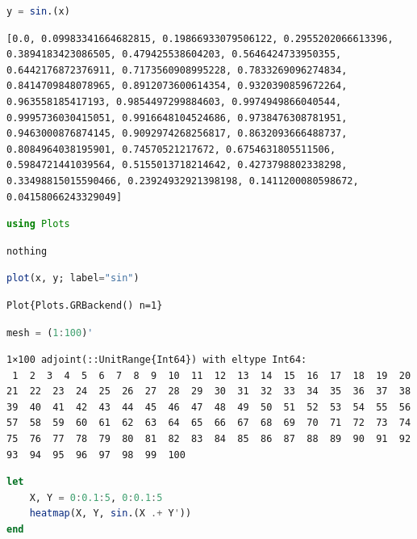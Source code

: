 \documentclass[
  notoc %
]{tufte-book}
\begin{document}
\begin{lstlisting}[language=Julia]
y = sin.(x)
\end{lstlisting}

\begin{lstlisting}[language=Output]
[0.0, 0.09983341664682815, 0.19866933079506122, 0.2955202066613396, 0.3894183423086505, 0.479425538604203, 0.5646424733950355, 0.6442176872376911, 0.7173560908995228, 0.7833269096274834, 0.8414709848078965, 0.8912073600614354, 0.9320390859672264, 0.963558185417193, 0.9854497299884603, 0.9974949866040544, 0.9995736030415051, 0.9916648104524686, 0.9738476308781951, 0.9463000876874145, 0.9092974268256817, 0.8632093666488737, 0.8084964038195901, 0.74570521217672, 0.6754631805511506, 0.5984721441039564, 0.5155013718214642, 0.4273798802338298, 0.33498815015590466, 0.23924932921398198, 0.1411200080598672, 0.04158066243329049]
\end{lstlisting}

\begin{lstlisting}[language=Julia]
using Plots
\end{lstlisting}

\begin{lstlisting}[language=Output]
nothing
\end{lstlisting}

\begin{lstlisting}[language=Julia]
plot(x, y; label="sin")
\end{lstlisting}

\begin{lstlisting}[language=Output]
Plot{Plots.GRBackend() n=1}
\end{lstlisting}

\begin{lstlisting}[language=Julia]
mesh = (1:100)'
\end{lstlisting}

\begin{lstlisting}[language=Output]
1×100 adjoint(::UnitRange{Int64}) with eltype Int64:
 1  2  3  4  5  6  7  8  9  10  11  12  13  14  15  16  17  18  19  20  21  22  23  24  25  26  27  28  29  30  31  32  33  34  35  36  37  38  39  40  41  42  43  44  45  46  47  48  49  50  51  52  53  54  55  56  57  58  59  60  61  62  63  64  65  66  67  68  69  70  71  72  73  74  75  76  77  78  79  80  81  82  83  84  85  86  87  88  89  90  91  92  93  94  95  96  97  98  99  100
\end{lstlisting}

\begin{lstlisting}[language=Julia]
let
    X, Y = 0:0.1:5, 0:0.1:5
    heatmap(X, Y, sin.(X .+ Y'))
end
\end{lstlisting}
\end{document}
